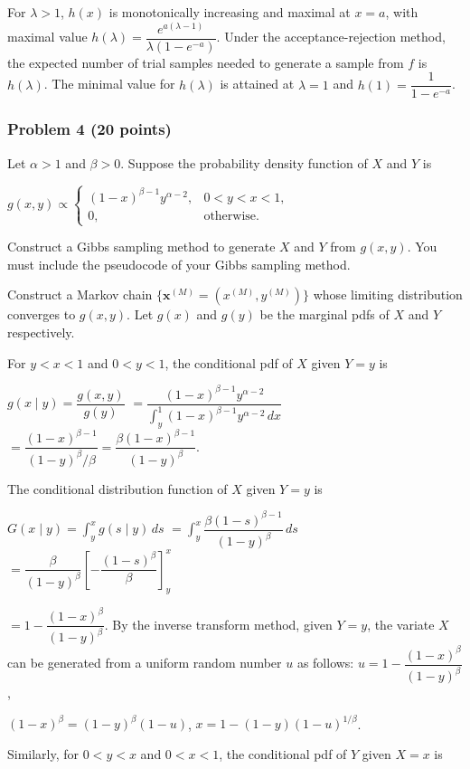 For $\lambda>1$, $h(x)$ is monotonically increasing and maximal at $x=a$, with maximal value
$h(\lambda)=\dfrac{e^{a(\lambda-1)}}{\lambda(1-e^{-a})}$.
Under the acceptance-rejection method, the expected number of trial samples needed to generate a sample from $f$ is $h(\lambda)$. The minimal value for $h(\lambda)$ is attained at $\lambda=1$ and
$h(1)=\dfrac1{1-e^{-a}}$.

\subsubsection*{Problem 4 (20 points)}

 Let $\alpha>1$ and $\beta>0$. Suppose the probability density function of $X$ and $Y$ is

$g(x,y)\propto\begin{cases}(1-x)^{\beta-1}y^{\alpha-2},&0<y<x<1,\\0,&\text{otherwise}.
\end{cases}$

Construct a Gibbs sampling method to generate $X$ and $Y$ from $g(x,y)$. You must include the pseudocode of your Gibbs sampling method.

 Construct a Markov chain $\{\mathbf x^{(M)}=(x^{(M)},y^{(M)})\}$ whose limiting distribution converges to $g(x,y)$. Let $g(x)$ and $g(y)$ be the marginal pdfs of $X$ and $Y$ respectively.

For $y<x<1$ and $0<y<1$, the conditional pdf of $X$ given $Y=y$ is

$g(x\mid y)=\dfrac{g(x,y)}{g(y)}$
$=\dfrac{(1-x)^{\beta-1}y^{\alpha-2}}{\int_y^1(1-x)^{\beta-1}y^{\alpha-2}\,dx}$
$=\dfrac{(1-x)^{\beta-1}}{(1-y)^\beta/\beta}
=\dfrac{\beta(1-x)^{\beta-1}}{(1-y)^\beta}$.

The conditional distribution function of $X$ given $Y=y$ is

$G(x\mid y)=\int_y^xg(s\mid y)\,ds$
$=\int_y^x\dfrac{\beta(1-s)^{\beta-1}}{(1-y)^\beta}\,ds$
$=\dfrac{\beta}{(1-y)^\beta}\left[-\dfrac{(1-s)^\beta}{\beta}\right]_y^x$

$=1-\dfrac{(1-x)^\beta}{(1-y)^\beta}$.
By the inverse transform method, given $Y=y$, the variate $X$ can be generated from a uniform random number $u$ as follows:
$u=1-\dfrac{(1-x)^\beta}{(1-y)^\beta}$,

$(1-x)^\beta=(1-y)^\beta(1-u)$,
$x=1-(1-y)(1-u)^{1/\beta}$.

Similarly, for $0<y<x$ and $0<x<1$, the conditional pdf of $Y$ given $X=x$ is

